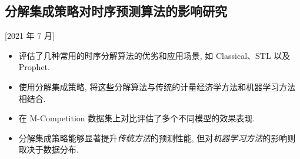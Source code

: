 \documentclass{mycv}
\begin{document}
\vspace{-\parskip}

\subsection{分解集成策略对时序预测算法的影响研究}[2021 年 7 月]

\begin{itemize}
  \itemsep 0.4em
  \item 评估了几种常用的时序分解算法的优劣和应用场景, 如 Classical、STL 以及 Prophet.
  \item 使用分解集成策略, 将这些分解算法与传统的计量经济学方法和机器学习方法相结合.
  \item 在 M-Competition 数据集上对比评估了多个不同模型的效果表现.
  \item 分解集成策略能够显著提升\textit{传统方法}的预测性能, 但对\textit{机器学习方法}的影响则取决于数据分布.
\end{itemize}



\vspace{-\parskip}



\end{document}
